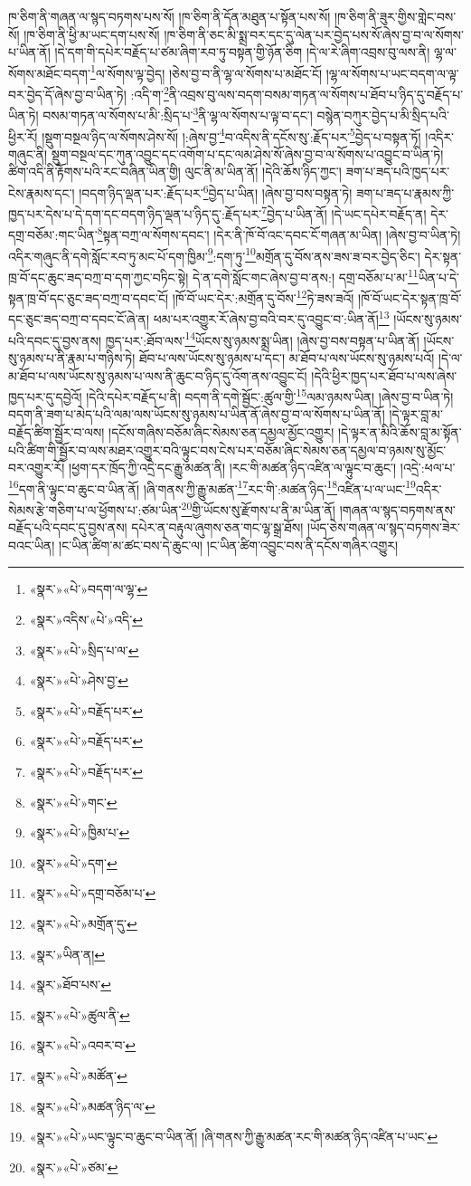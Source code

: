 ཁ་ཅིག་ནི་གཞན་ལ་སྙད་བཏགས་པས་སོ། །ཁ་ཅིག་ནི་དོན་མཐུན་པ་སྟོན་པས་སོ། །ཁ་ཅིག་ནི་ཟུར་གྱིས་གླེང་བས་སོ། །ཁ་ཅིག་ནི་ཕྱི་མ་ཡང་དག་པས་སོ། །ཁ་ཅིག་ནི་ཅང་མི་སྨྲ་བར་དང་དུ་ལེན་པར་བྱེད་པས་སོ་ཞེས་བྱ་བ་ལ་སོགས་པ་ཡིན་ནོ། །དེ་དག་གི་དཔེར་བརྗོད་པ་ཙམ་ཞིག་རབ་ཏུ་བསྟན་གྱི་ཉོན་ཅིག །དེ་ལ་རེ་ཞིག་འབྲས་བུ་ལས་ནི། ལྷ་ལ་སོགས་མཐོང་བདག་\footnote{«སྣར་»«པེ་»བདག་ལ་ལྷ་}ལ་སོགས་ལྟ་བྱེད། །ཅེས་བྱ་བ་ནི་ལྷ་ལ་སོགས་པ་མཐོང་ངོ། །ལྷ་ལ་སོགས་པ་ཡང་བདག་ལ་ལྟ་བར་བྱེད་དོ་ཞེས་བྱ་བ་ཡིན་ཏེ། :འདི་ག་\footnote{«སྣར་»འདིས་«པེ་»འདི་}ནི་འབྲས་བུ་ལས་བདག་བསམ་གཏན་ལ་སོགས་པ་ཐོབ་པ་ཉིད་དུ་བརྗོད་པ་ཡིན་ཏེ། བསམ་གཏན་ལ་སོགས་པ་མི་:སྲིད་པ་\footnote{«སྣར་»«པེ་»སྲིད་པ་ལ་}ནི་ལྷ་ལ་སོགས་པ་ལྟ་བ་དང་། བསྙེན་བཀུར་བྱེད་པ་མི་སྲིད་པའི་ཕྱིར་རོ། །སྡུག་བསྔལ་ཉིད་ལ་སོགས་ཤེས་སོ། །:ཞེས་བྱ་\footnote{«སྣར་»«པེ་»ཤེས་བྱ་}བ་འདིས་ནི་དངོས་སུ་:རྗོད་པར་\footnote{«སྣར་»«པེ་»བརྗོད་པར་}བྱེད་པ་བསྟན་ཏོ། །འདིར་གཞུང་ནི། སྡུག་བསྔལ་དང་ཀུན་འབྱུང་དང་འགོག་པ་དང་ལམ་ཤེས་སོ་ཞེས་བྱ་བ་ལ་སོགས་པ་འབྱུང་བ་ཡིན་ཏེ། ཚིག་འདི་ནི་རྟོགས་པའི་རང་བཞིན་ཡིན་གྱི། ལུང་ནི་མ་ཡིན་ནོ། །དེའི་ཆོས་ཉིད་ཀྱང་། ཟག་པ་ཟད་པའི་ཁྱད་པར་ངེས་རྣམས་དང་། །བདག་ཉིད་ལྡན་པར་:རྗོད་པར་\footnote{«སྣར་»«པེ་»བརྗོད་པར་}བྱེད་པ་ཡིན། །ཞེས་བྱ་བས་བསྟན་ཏེ། ཟག་པ་ཟད་པ་རྣམས་ཀྱི་ཁྱད་པར་དེས་པ་དེ་དག་དང་བདག་ཉིད་ལྡན་པ་ཉིད་དུ་:རྗོད་པར་\footnote{«སྣར་»«པེ་»བརྗོད་པར་}བྱེད་པ་ཡིན་ནོ། །དེ་ཡང་དཔེར་བརྗོད་ན། དེར་དགྲ་བཅོམ་:གང་ཡིན་\footnote{«སྣར་»«པེ་»གང་}སྟན་བཀྲ་ལ་སོགས་དབང་། །དེར་ནི་ཁོ་བོ་འང་དབང་ངོ་གཞན་མ་ཡིན། །ཞེས་བྱ་བ་ཡིན་ཏེ། འདིར་གཞུང་ནི་དགེ་སློང་རབ་ཏུ་མང་པོ་དག་ཁྱིམ་\footnote{«སྣར་»«པེ་»ཁྱིམ་པ་}:དག་ཏུ་\footnote{«སྣར་»«པེ་»དག་}མགྲོན་དུ་བོས་ནས་ཟས་ཟ་བར་བྱེད་ཅིང་། དེར་སྟན་ཁྲ་བོ་དང་ཆུང་ཟད་བཀྲ་བ་དག་ཀྱང་བཏིང་སྟེ། དེ་ན་དགེ་སློང་གང་ཞེས་བྱ་བ་ནས:། དགྲ་བཅོམ་པ་མ་\footnote{«སྣར་»«པེ་»དགྲ་བཅོམ་པ་}ཡིན་པ་དེ་སྟན་ཁྲ་བོ་དང་ཅུང་ཟད་བཀྲ་བ་དབང་ངོ། །ཁོ་བོ་ཡང་དེར་:མགྲོན་དུ་བོས་\footnote{«སྣར་»«པེ་»མགྲོན་དུ་}ཏེ་ཟས་ཟའོ། །ཁོ་བོ་ཡང་དེར་སྟན་ཁྲ་བོ་དང་ཅུང་ཟད་བཀྲ་བ་དབང་ངོ་ཞེ་ན། ཕམ་པར་འགྱུར་རོ་ཞེས་བྱ་བའི་བར་དུ་འབྱུང་བ་:ཡིན་ནོ།\footnote{«སྣར་»ཡིན་ན།} །ཡོངས་སུ་ཉམས་པའི་དབང་དུ་བྱས་ནས། ཁྱད་པར་:ཐོབ་ལས་\footnote{«སྣར་»ཐོབ་པས་}ཡོངས་སུ་ཉམས་སྨྲ་ཡིན། །ཞེས་བྱ་བས་བསྟན་པ་ཡིན་ནོ། །ཡོངས་སུ་ཉམས་པ་ནི་རྣམ་པ་གཉིས་ཏེ། ཐོབ་པ་ལས་ཡོངས་སུ་ཉམས་པ་དང་། མ་ཐོབ་པ་ལས་ཡོངས་སུ་ཉམས་པའོ། །དེ་ལ་མ་ཐོབ་པ་ལས་ཡོངས་སུ་ཉམས་པ་ལས་ནི་ཆུང་བ་ཉིད་དུ་འོག་ནས་འབྱུང་ངོ། །དེའི་ཕྱིར་ཁྱད་པར་ཐོབ་པ་ལས་ཞེས་ཁྱད་པར་དུ་དབྱེའོ། །དེའི་དཔེར་བརྗོད་པ་ནི། བདག་ནི་དགེ་སྦྱོང་:ཚུལ་གྱི་\footnote{«སྣར་»«པེ་»ཚུལ་ནི་}ལམ་ཉམས་ཡིན། །ཞེས་བྱ་བ་ཡིན་ཏེ། བདག་ནི་ཟག་པ་མེད་པའི་ལམ་ལས་ཡོངས་སུ་ཉམས་པ་ཡིན་ནོ་ཞེས་བྱ་བ་ལ་སོགས་པ་ཡིན་ནོ། །དེ་ལྟར་བླ་མ་བརྗོད་ཚིག་སྦྱོར་བ་ལས། །དངོས་གཞིས་བཅོམ་ཞིང་སེམས་ཅན་དམྱལ་མྱོང་འགྱུར། །དེ་ལྟར་ན་མིའི་ཆོས་བླ་མ་སྟོན་པའི་ཚིག་གི་སྦྱོར་བ་ལས་མཐར་འགྱུར་བའི་ལྟུང་བས་ངེས་པར་བཅོམ་ཞིང་སེམས་ཅན་དམྱལ་བ་ཉམས་སུ་མྱོང་བར་འགྱུར་རོ། །ཕྱག་དར་ཁྲོད་ཀྱི་འདྲེ་དང་རྒྱུ་མཚན་ནི། །རང་གི་མཚན་ཉིད་འཛིན་ལ་ལྟུང་བ་ཆུང་། །འདྲེ་:ཕལ་པ་\footnote{«སྣར་»«པེ་»འབར་བ་}དག་ནི་ལྟུང་བ་ཆུང་བ་ཡིན་ནོ། །ཞི་གནས་ཀྱི་རྒྱུ་མཚན་\footnote{«སྣར་»«པེ་»མཚོན་}རང་གི་:མཚན་ཉིད་\footnote{«སྣར་»«པེ་»མཚན་ཉིད་ལ་}འཛིན་པ་ལ་ཡང་\footnote{«སྣར་»«པེ་»ཡང་ལྟུང་བ་ཆུང་བ་ཡིན་ནོ། །ཞི་གནས་ཀྱི་རྒྱུ་མཚན་རང་གི་མཚན་ཉིད་འཛིན་པ་ཡང་}འདིར་སེམས་རྩེ་གཅིག་པ་ལ་ཕྱོགས་པ་:ཙམ་ཡིན་\footnote{«སྣར་»«པེ་»ཙམ་}གྱི་ཡོངས་སུ་རྫོགས་པ་ནི་མ་ཡིན་ནོ། །གཞན་ལ་སྙད་བཏགས་ནས་བརྗོད་པའི་དབང་དུ་བྱས་ནས། དཔེར་ན་བརྟུལ་ཞུགས་ཅན་གང་ལྷ་སྒྲ་ཐོས། །ཡོད་ཅེས་གཞན་ལ་སྙད་བཏགས་ཟེར་བའང་ཡིན། །ང་ཡིན་ཚིག་མ་ཚང་བས་དེ་ཆུང་ལ། །ང་ཡིན་ཚིག་འབྱུང་བས་ནི་དངོས་གཞིར་འགྱུར། 